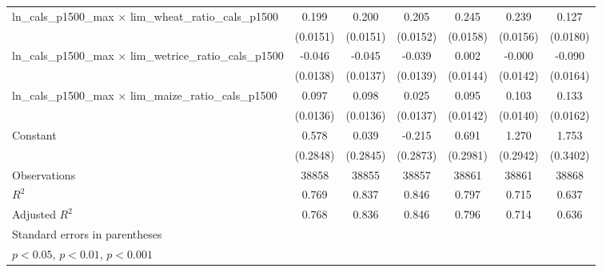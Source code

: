 {\begin{tabular}{l*{6}{c}}
\addlinespace
ln\_cals\_p1500\_max $\times$ lim\_wheat\_ratio\_cals\_p1500&       0.199\sym{***}&       0.200\sym{***}&       0.205\sym{***}&       0.245\sym{***}&       0.239\sym{***}&       0.127\sym{***}\\
                    &    (0.0151)         &    (0.0151)         &    (0.0152)         &    (0.0158)         &    (0.0156)         &    (0.0180)         \\
\addlinespace
ln\_cals\_p1500\_max $\times$ lim\_wetrice\_ratio\_cals\_p1500&      -0.046\sym{***}&      -0.045\sym{***}&      -0.039\sym{**} &       0.002         &      -0.000         &      -0.090\sym{***}\\
                    &    (0.0138)         &    (0.0137)         &    (0.0139)         &    (0.0144)         &    (0.0142)         &    (0.0164)         \\
\addlinespace
ln\_cals\_p1500\_max $\times$ lim\_maize\_ratio\_cals\_p1500&       0.097\sym{***}&       0.098\sym{***}&       0.025         &       0.095\sym{***}&       0.103\sym{***}&       0.133\sym{***}\\
                    &    (0.0136)         &    (0.0136)         &    (0.0137)         &    (0.0142)         &    (0.0140)         &    (0.0162)         \\
\addlinespace
Constant            &       0.578\sym{*}  &       0.039         &      -0.215         &       0.691\sym{*}  &       1.270\sym{***}&       1.753\sym{***}\\
                    &    (0.2848)         &    (0.2845)         &    (0.2873)         &    (0.2981)         &    (0.2942)         &    (0.3402)         \\
\midrule
Observations        &       38858         &       38855         &       38857         &       38861         &       38861         &       38868         \\
\(R^{2}\)           &       0.769         &       0.837         &       0.846         &       0.797         &       0.715         &       0.637         \\
Adjusted \(R^{2}\)  &       0.768         &       0.836         &       0.846         &       0.796         &       0.714         &       0.636         \\
\bottomrule
\multicolumn{7}{l}{\footnotesize Standard errors in parentheses}\\
\multicolumn{7}{l}{\footnotesize \sym{*} \(p<0.05\), \sym{**} \(p<0.01\), \sym{***} \(p<0.001\)}\\
\end{tabular}
}
